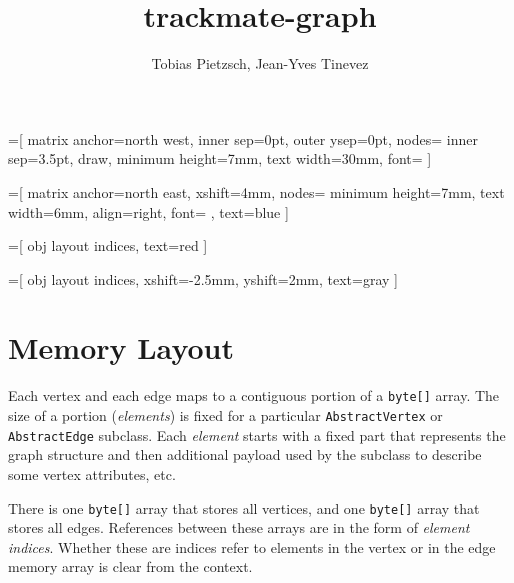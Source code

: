 \documentclass[a4paper]{article}
\begin{document}
\title{trackmate-graph}
\author{Tobias Pietzsch, Jean-Yves Tinevez}
\maketitle




=[
  	matrix anchor=north west,
		inner sep=0pt,
		outer ysep=0pt,
		nodes={
			inner sep=3.5pt,
			draw,
			minimum height=7mm,
			text width=30mm,
			font=\ttfamily
		}
	]
	
=[
  	matrix anchor=north east,
		xshift=4mm,
		nodes={
			minimum height=7mm,
			text width=6mm,
			align=right,
			font=\ttfamily
		},
		text=blue
	]
	
=[
		obj layout indices,
		text=red
	]
	
=[
		obj layout indices,
		xshift=-2.5mm,
		yshift=2mm,
		text=gray
	]


\section{Memory Layout}

Each vertex and each edge maps to a contiguous portion of a \texttt{byte[]} array.
The size of a portion (\emph{elements}) is fixed for a particular \texttt{AbstractVertex} or \texttt{AbstractEdge} subclass.
Each \emph{element} starts with a fixed part that represents the graph structure and then
	additional payload used by the subclass to describe some vertex attributes, etc.
 
There is one \texttt{byte[]} array that stores all vertices,
	and one \texttt{byte[]} array that stores all edges.
References between these arrays are in the form of \emph{element indices}.
Whether these are indices refer to elements in the vertex or in the edge memory array is clear from the context.
\end{document}
